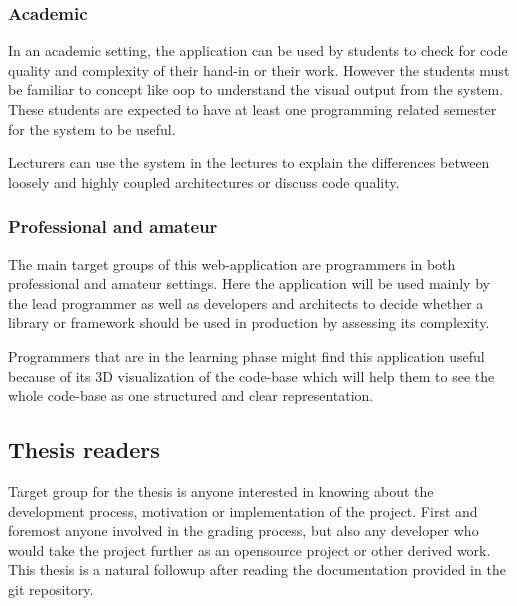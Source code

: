 \subsubsection{Academic}
In an academic setting, the application can be used by students to check for code quality and complexity of their hand-in or their work. However the students must be familiar to concept like \gls{oop} to understand the visual output from the system. These students are expected to have at least one programming related semester for the system to be useful. 

Lecturers can use the system in the lectures to explain the differences between loosely and highly coupled architectures or discuss code quality.

\subsubsection{Professional and amateur}
The main target groups of this web-application are programmers in both professional and amateur settings. Here the application will be used mainly by the lead programmer as well as developers and architects to decide whether a library or framework should be used in production by assessing its complexity. 

Programmers that are in the learning phase might find this application useful because of its 3D visualization of the code-base which will help them to see the whole code-base as one structured and clear representation.

\subsection{Thesis readers}
Target group for the thesis is anyone interested in knowing about the development process, motivation or implementation of the project. First and foremost anyone involved in the grading process, but also any developer who would take the project further as an \gls{opensource} project or other derived work.
This thesis is a natural followup after reading the documentation provided in the \gls{git} repository.


